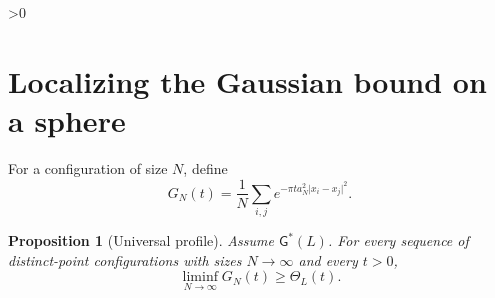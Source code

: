\documentclass[11pt,a4paper]{article}
\newtheorem{proposition}[theorem]{Proposition}
\theoremstyle{definition}
\newcommand{\abs}[1]{\lvert#1\rvert}
\newcommand{\G}{\mathsf G}
\numberwithin{equation}{section}
\let\originalsection\section
\renewcommand{\section}{\ifnum\value{section}>0\clearpage\fi\originalsection}
\begin{document}
\section{Localizing the Gaussian bound on a sphere}\label{sec:localization}
For a configuration of size $N$, define
\begin{equation}\label{eq:GN}
 G_N(t)=\frac1N\sum_{i,j}e^{-\pi t a_N^2\abs{x_i-x_j}^2}.
\end{equation}

\begin{proposition}[Universal profile]\label{prop:profile}
Assume $\G^*(L)$. For every sequence of distinct-point configurations with sizes $N\to\infty$ and every $t>0$,
\begin{equation}\label{eq:profile}
 \liminf_{N\to\infty}G_N(t)\ge\Theta_L(t).
\end{equation}
\end{proposition}
\end{document}
